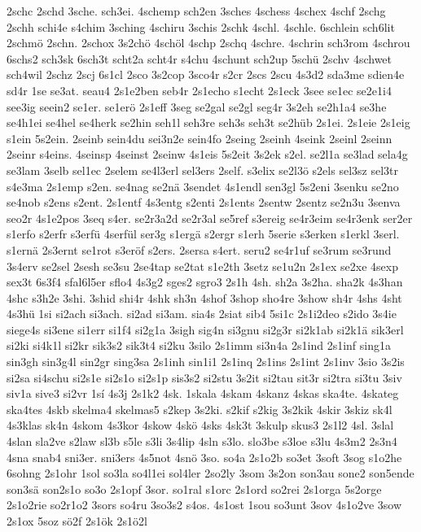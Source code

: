 {2schc
2schd
3sche.
sch3ei.
4schemp
sch2en
3sches
4schess
4schex
4schf
2schg
2schh
schi4e
s4chim
3sching
4schiru
3schis
2schk
4schl.
4schle.
6schlein
sch6lit
2schmö
2schn.
2schox
3s2chö
4schöl
4schp
2schq
4schre.
4schrin
sch3rom
4schrou
6schs2
sch3sk
6sch3t
scht2a
scht4r
s4chu
4schunt
sch2up
5schü
2schv
4schwet
sch4wil
2schz
2scj
6s1cl
2sco
3s2cop
3sco4r
s2cr
2scs
2scu
4s3d2
sda3me
sdien4e
sd4r
1se
se3at.
seau4
2s1e2ben
seb4r
2s1echo
s1echt
2s1eck
3see
se1ec
se2e1i4
see3ig
seein2
se1er.
se1erö
2s1eff
3seg
se2gal
se2gl
seg4r
3s2eh
se2h1a4
se3he
se4h1ei
se4hel
se4herk
se2hin
seh1l
seh3re
seh3s
seh3t
se2hüb
2s1ei.
2s1eie
2s1eig
s1ein
5s2ein.
2seinb
sein4du
sei3n2e
sein4fo
2seing
2seinh
4seink
2seinl
2seinn
2seinr
s4eins.
4seinsp
4seinst
2seinw
4s1eis
5s2eit
3s2ek
s2el.
se2l1a
se3lad
sela4g
se3lam
3selb
sel1ec
2selem
se4l3erl
sel3ers
2self.
s3elix
se2l3ö
s2els
sel3sz
sel3tr
s4e3ma
2s1emp
s2en.
se4nag
se2nä
3sendet
4s1endl
sen3gl
5s2eni
3senku
se2no
se4nob
s2ens
s2ent.
2s1entf
4s3entg
s2enti
2s1ents
2sentw
2sentz
se2n3u
3senva
seo2r
4s1e2pos
3seq
s4er.
se2r3a2d
se2r3al
se5ref
s3ereig
se4r3eim
se4r3enk
ser2er
s1erfo
s2erfr
s3erfü
4serfül
ser3g
s1ergä
s2ergr
s1erh
5serie
s3erken
s1erkl
3serl.
s1ernä
2s3ernt
se1rot
s3eröf
s2ers.
2sersa
s4ert.
seru2
se4r1uf
se3rum
se3rund
3s4erv
se2sel
2sesh
se3su
2se4tap
se2tat
s1e2th
3setz
se1u2n
2s1ex
se2xe
4sexp
sex3t
6s3f4
sfal6l5er
sflo4
4s3g2
sges2
sgro3
2s1h
4sh.
sh2a
3s2ha.
sha2k
4s3han
4shc
s3h2e
3shi.
3shid
shi4r
4shk
sh3n
4shof
3shop
sho4re
3show
sh4r
4shs
4sht
4s3hü
1si
si2ach
si3ach.
si2ad
si3am.
sia4s
2siat
sib4
5si1c
2s1i2deo
s2ido
3s4ie
siege4s
si3ene
si1err
si1f4
si2g1a
3sigh
sig4n
si3gnu
si2g3r
si2k1ab
si2k1ä
sik3erl
si2ki
si4k1l
si2kr
sik3s2
sik3t4
si2ku
3silo
2s1imm
si3n4a
2s1ind
2s1inf
sing1a
sin3gh
sin3g4l
sin2gr
sing3sa
2s1inh
sin1i1
2s1inq
2s1ins
2s1int
2s1inv
3sio
3s2is
si2sa
si4schu
si2s1e
si2s1o
si2s1p
sis3s2
si2stu
3s2it
si2tau
sit3r
si2tra
si3tu
3siv
siv1a
sive3
si2vr
1sí
4s3j
2s1k2
4sk.
1skala
4skam
4skanz
4skas
ska4te.
4skateg
ska4tes
4skb
skelma4
skelmas5
s2kep
3s2ki.
s2kif
s2kig
3s2kik
4skir
3skiz
sk4l
4s3klas
sk4n
4skom
4s3kor
4skow
4skö
4sks
4sk3t
3skulp
skus3
2s1l2
4sl.
3slal
4slan
sla2ve
s2law
sl3b
s5le
s3li
3s4lip
4sln
s3lo.
slo3be
s3loe
s3lu
4s3m2
2s3n4
4sna
snab4
sni3er.
sni3ers
4s5not
4snö
3so.
so4a
2s1o2b
so3et
3soft
3sog
s1o2he
6sohng
2s1ohr
1sol
so3la
so4l1ei
sol4ler
2so2ly
3som
3s2on
son3au
sone2
son5ende
son3sä
son2s1o
so3o
2s1opf
3sor.
so1ral
s1orc
2s1ord
so2rei
2s1orga
5s2orge
2s1o2rie
so2r1o2
3sors
so4ru
3so3s2
s4os.
4s1ost
1sou
so3unt
3sov
4s1o2ve
3sow
2s1ox
5soz
sö2f
2s1ök
2s1ö2l
}
